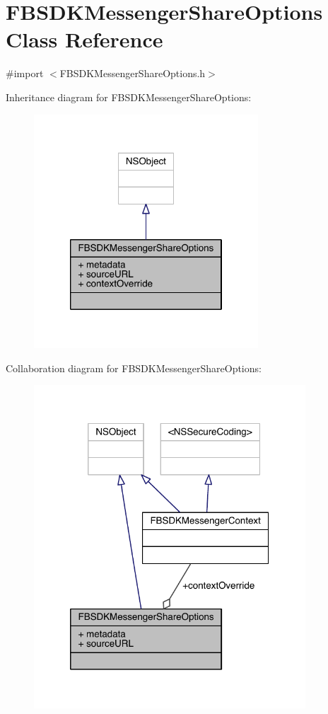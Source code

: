 \hypertarget{interface_f_b_s_d_k_messenger_share_options}{\section{F\-B\-S\-D\-K\-Messenger\-Share\-Options Class Reference}
\label{interface_f_b_s_d_k_messenger_share_options}
}


{\ttfamily \#import $<$F\-B\-S\-D\-K\-Messenger\-Share\-Options.\-h$>$}



Inheritance diagram for F\-B\-S\-D\-K\-Messenger\-Share\-Options\-:
\nopagebreak
\begin{figure}[H]
\begin{center}
\leavevmode
\includegraphics[width=238pt]{interface_f_b_s_d_k_messenger_share_options__inherit__graph}
\end{center}
\end{figure}


Collaboration diagram for F\-B\-S\-D\-K\-Messenger\-Share\-Options\-:
\nopagebreak
\begin{figure}[H]
\begin{center}
\leavevmode
\includegraphics[width=288pt]{interface_f_b_s_d_k_messenger_share_options__coll__graph}
\end{center}
\end{figure}
